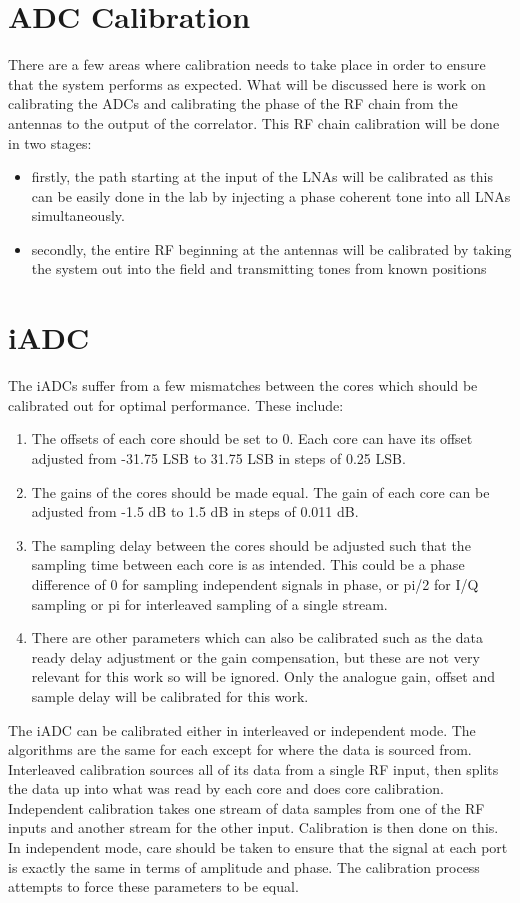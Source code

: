 \section{ADC Calibration}

There are a few areas where calibration needs to take place in order to ensure that the system performs as expected. What will be discussed here is work on calibrating the ADCs and calibrating the phase of the RF chain from the antennas to the output of the correlator. This RF chain calibration will be done in two stages: 
\begin{itemize}
  \item firstly, the path starting at the input of the LNAs will be calibrated as this can be easily done in the lab by injecting a phase coherent tone into all LNAs simultaneously.
  \item secondly, the entire RF beginning at the antennas will be calibrated by taking the system out into the field and transmitting tones from known positions
\end{itemize}

\section{iADC}
The iADCs suffer from a few mismatches between the cores which should be calibrated out for optimal performance. These include:
\begin{enumerate}
  \item The offsets of each core should be set to 0. Each core can have its offset adjusted from -31.75 LSB to 31.75 LSB in steps of 0.25 LSB.
  \item The gains of the cores should be made equal. The gain of each core can be adjusted from -1.5 dB to 1.5 dB in steps of 0.011 dB. 
  \item The sampling delay between the cores should be adjusted such that the sampling time between each core is as intended. This could be a phase difference of 0 for sampling independent signals in phase, or pi/2 for I/Q sampling or pi for interleaved sampling of a single stream.
  \item There are other parameters which can also be calibrated such as the data ready delay adjustment or the gain compensation, but these are not very relevant for this work so will be ignored. Only the analogue gain, offset and sample delay will be calibrated for this work.
\end{enumerate}

The iADC can be calibrated either in interleaved or independent mode. The algorithms are the same for each except for where the data is sourced from. Interleaved calibration sources all of its data from a single RF input, then splits the data up into what was read by each core and does core calibration. Independent calibration takes one stream of data samples from one of the RF inputs and another stream for the other input. Calibration is then done on this. In independent mode, care should be taken to ensure that the signal at each port is exactly the same in terms of amplitude and phase. The calibration process attempts to force these parameters to be equal.

